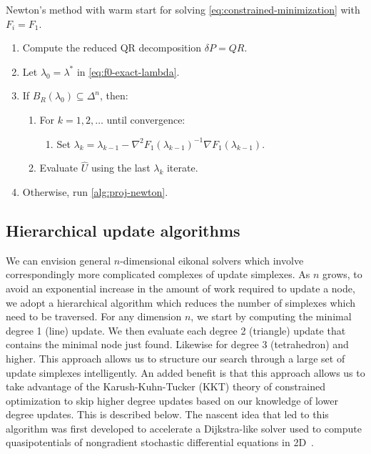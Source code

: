 \documentclass[eikonal.tex]{subfiles}
\begin{document}
\begin{algorithm}[H]
  \caption{Newton's method with warm start for solving
    \cref{eq:constrained-minimization} with
    $F_i = F_1$.}\label{alg:warm-start-newton}
  \begin{enumerate}[nolistsep]
  \item Compute the reduced QR decomposition $\delta P = QR$.
  \item Let $\lambda_0 = \lambda^*$ in \cref{eq:f0-exact-lambda}.
  \item If $B_R(\lambda_0) \subseteq \Delta^n$, then:
    \begin{enumerate}[nolistsep]
    \item For $k = 1, 2, \hdots$ until convergence:
      \begin{enumerate}
      \item Set
        $\lambda_k = \lambda_{k-1} - \nabla^2
        F_1(\lambda_{k-1})^{-1} \nabla
        F_1(\lambda_{k-1})$.
      \end{enumerate}
    \item Evaluate $\hat{U}$ using the last $\lambda_k$ iterate.
    \end{enumerate}
  \item Otherwise, run \cref{alg:proj-newton}.
  \end{enumerate}
\end{algorithm}

\subsection[Update algorithms]{Hierarchical update algorithms}

We can envision general $n$-dimensional eikonal solvers which involve
correspondingly more complicated complexes of update simplexes. As $n$
grows, to avoid an exponential increase in the amount of work required
to update a node, we adopt a hierarchical algorithm which reduces the
number of simplexes which need to be traversed. For any dimension $n$,
we start by computing the minimal degree 1 (line) update. We then
evaluate each degree 2 (triangle) update that contains the minimal
node just found. Likewise for degree 3 (tetrahedron) and higher. This
approach allows us to structure our search through a large set of
update simplexes intelligently. An added benefit is that this approach
allows us to take advantage of the Karush-Kuhn-Tucker (KKT) theory of
constrained optimization to skip higher degree updates based on our
knowledge of lower degree updates. This is described below. The
nascent idea that led to this algorithm was first developed to
accelerate a Dijkstra-like solver used to compute quasipotentials of
nongradient stochastic differential equations in
2D~\cite{dahiya2017ordered}.
\end{document}
